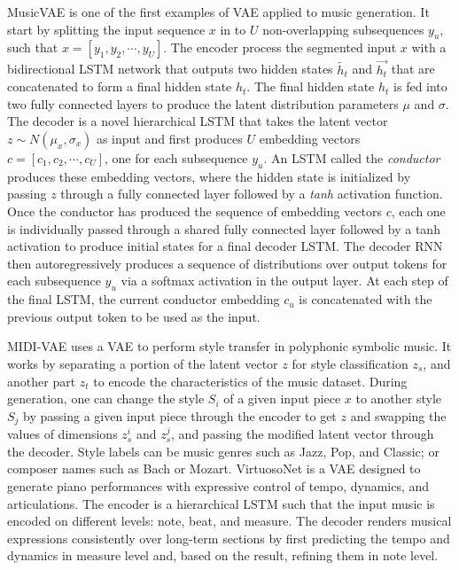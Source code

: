 MusicVAE \cite{Roberts2017} is one of the first examples of VAE applied to music generation. It start by splitting the input sequence $x$ in to $U$ non-overlapping subsequences $y_u$, such that $x = [y_1, y_2, \cdots, y_U]$. The encoder process the segmented input $x$ with a bidirectional LSTM network that outputs two hidden states $\overleftarrow{h_t}$ and $\overrightarrow{h_t}$ that are concatenated to form a final hidden state $h_t$. The final hidden state $h_t$ is fed into two fully connected layers to produce the latent distribution parameters $\mu$ and $\sigma$. The decoder is a novel hierarchical LSTM that takes the latent vector $z \sim N(\mu_x, \sigma_x)$ as input and first produces $U$ embedding vectors $c = [c_1, c_2, \cdots, c_U]$, one for each subsequence $y_u$. An LSTM called the \textit{conductor} produces these embedding vectors, where the hidden state is initialized by passing $z$ through a fully connected layer followed by a \textit{tanh} activation function. Once the conductor has produced the sequence of embedding vectors $c$, each one is individually passed through a shared fully connected layer followed by a tanh activation to produce initial states for a final decoder LSTM. The decoder RNN then autoregressively produces a sequence of distributions over output tokens for each subsequence $y_u$ via a softmax activation in the output layer. At each step of the final LSTM, the current conductor embedding $c_u$ is concatenated with the previous output token to be used as the input.

MIDI-VAE \cite{brunner2018midi} uses a VAE to perform style transfer in polyphonic symbolic music. It works by separating a portion of the latent vector $z$ for style classification $z_s$, and another part $z_t$ to encode the characteristics of the music dataset. During generation, one can change the style $S_i$ of a given input piece $x$ to another style $S_j$ by passing a given input piece through the encoder to get $z$ and swapping the values of dimensions $z_s^i$ and $z_s^j$, and passing the modified latent vector through the decoder. Style labels can be music genres such as Jazz, Pop, and Classic; or composer names such as Bach or Mozart. VirtuosoNet \cite{jeong2019virtuosonet} is a VAE designed to generate piano performances with expressive control of tempo, dynamics, and articulations. The encoder is a hierarchical LSTM such that the input music is encoded on different levels: note, beat, and measure. The decoder renders musical expressions consistently over long-term sections by first predicting the tempo and dynamics in measure level and, based on the result, refining them in note level.

